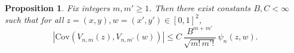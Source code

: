 \documentclass[11pt]{article}
\newtheorem{prop}[thm]{Proposition}
\newcommand{\cov}{\mathrm{Cov}}
\newcommand{\bone}{\mathbbm{1}}
\begin{document}

\begin{prop}
\label{prop:covariance-Vm}
Fix integers $m,m'\ge1$. Then there exist constants $B, C < \infty$ such that for all
$z=(x,y), w=(x',y')\in[0,1]^2$,
\begin{equation}
\left|
\cov\!\left(V_{n,m}(z),V_{n,m'}(w)\right)
\right|
\le
C\,\frac{B^{m+m'}}{\sqrt{m!\,m'!}}\,\psi_n(z,w).
\label{eq:14}
\end{equation}
\end{prop}
\end{document}
